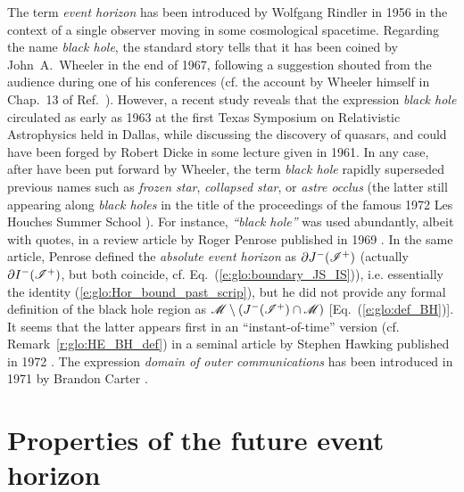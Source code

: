\begin{hist}
\label{h:glo:black_hole_name}
The term \emph{event horizon} has been introduced by Wolfgang Rindler in 1956 \cite{Rindl56}
in the context of a single observer moving in some cosmological spacetime.
Regarding the name \emph{black hole}, the standard
story tells that it has been coined by John~A.~Wheeler in the end of 1967,
following a suggestion shouted from the audience during one of his conferences
(cf. the account by Wheeler himself in Chap.~13 of Ref.~\cite{Wheel98}).
However, a recent study \cite{HerdeL18} reveals that the expression \emph{black hole}
circulated as early as 1963 at the first Texas Symposium on Relativistic Astrophysics
held in Dallas,
while discussing the discovery of quasars, and could have been forged by
Robert Dicke in some lecture given in 1961.
In any case, after have been put forward by Wheeler,
the term \emph{black hole} rapidly superseded previous names such as
\emph{frozen star}, \emph{collapsed star}, or \emph{astre occlus}
(the latter still appearing along \emph{black holes} in the title of
the proceedings of the famous 1972 Les Houches Summer School \cite{DeWit73}).
For instance, \emph{``black hole''} was used abundantly, albeit with
quotes, in a review article by Roger Penrose published
in 1969 \cite{Penro69}. In the same article, Penrose defined the \emph{absolute event horizon}
as $\partial J^-(\mathscr{I}^+)$ (actually $\partial I^-(\mathscr{I}^+)$, but both coincide, cf.
Eq.~(\ref{e:glo:boundary_JS_IS})), i.e. essentially the identity (\ref{e:glo:Hor_bound_past_scrip}), but he did not provide any formal definition of the
black hole region as $ \mathscr{M} \setminus (J^-(\mathscr{I}^+)\cap\mathscr{M})$ [Eq.~(\ref{e:glo:def_BH})].
It seems that the latter appears first in an ``instant-of-time'' version
(cf. Remark~\ref{r:glo:HE_BH_def}) in a seminal article by Stephen Hawking published in 1972 \cite{Hawki72}.
The expression \emph{domain of outer communications} has been introduced in 1971 by
Brandon Carter \cite{Carte71}.
\end{hist}



\section{Properties of the future event horizon} \label{s:glo:properties_H}

